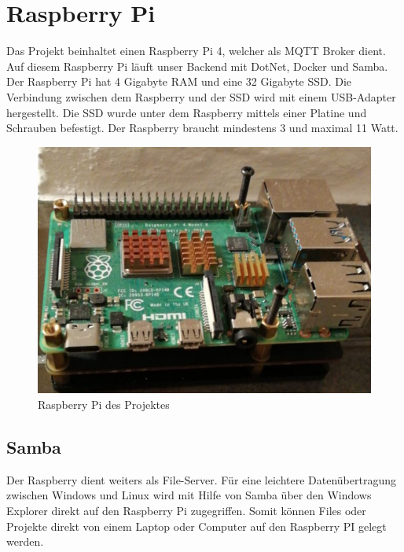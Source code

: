\section{Raspberry Pi}

Das Projekt beinhaltet einen Raspberry Pi 4, welcher als MQTT Broker dient. Auf diesem Raspberry Pi läuft unser Backend mit DotNet, Docker und Samba.
Der Raspberry Pi hat 4 Gigabyte RAM und eine 32 Gigabyte SSD. 
Die Verbindung zwischen dem Raspberry und der SSD wird mit einem USB-Adapter hergestellt. 
Die SSD wurde unter dem Raspberry mittels einer Platine und Schrauben befestigt. 
Der Raspberry braucht mindestens 3 und maximal 11 Watt. 
\cite{RASPPI}

\begin{figure}[H]
    \centering
    \includegraphics[width=1\textwidth]{pics/Raspberry.JPG}
    \caption{Raspberry Pi des Projektes}
\end{figure}

\subsection{Samba}
Der Raspberry dient weiters als File-Server. Für eine leichtere Datenübertragung zwischen Windows und Linux wird mit Hilfe von Samba über den Windows Explorer direkt auf den Raspberry Pi zugegriffen.
Somit können Files oder Projekte direkt von einem Laptop oder Computer auf den Raspberry PI gelegt werden.

